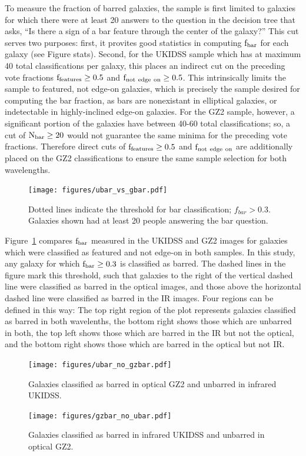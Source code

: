 To measure the fraction of barred galaxies, the sample is first limited to galaxies for which there were at least 20 answers to the question in the decision tree that asks, ``Is there a sign of a bar feature through the center of the galaxy?'' This cut serves two purposes: first, it provites good statistics in computing $\rm f_{bar}$ for each galaxy (see Figure stats). Second, for the UKIDSS sample which has at maximum 40 total classifications per galaxy, this places an indirect cut on the preceding vote fractions $\rm f_{features} \ge 0.5$ and $\rm f_{not~edge~on} \ge 0.5$. This intrinsically limits the sample to featured, not edge-on galaxies, which is precisely the sample desired for computing the bar fraction, as bars are nonexistant in elliptical galaxies, or indetectable in highly-inclined edge-on galaxies. For the GZ2 sample, however, a significant portion of the galaxies have between 40-60 total classifications; so, a cut of $\rm N_{bar} \ge 20$ would not guarantee the same minima for the preceding vote fractions. Therefore direct cuts of $\rm f_{features} \ge 0.5$ and $\rm f_{not~edge~on}$ are additionally placed on the GZ2 classifications to ensure the same sample selection for both wavelengths.  

\begin{figure}
\centering
\texttt{[image: figures/ubar\_vs\_gbar.pdf]}
\caption{Dotted lines indicate the threshold for bar classification; $f_{bar}>0.3$. Galaxies shown had at least 20 people answering the bar question. }
\label{fig:ubarvgbar}
\end{figure}

Figure~\ref{fig:ubarvgbar} compares $\rm f_{bar}$ measured in the UKIDSS and GZ2 images for galaxies which were classified as featured and not edge-on in both samples. In this study, any galaxy for which $\rm f_{bar} \ge 0.3$ is classified as barred. The dashed lines in the figure mark this threshold, such that galaxies to the right of the vertical dashed line were classified as barred in the optical images, and those above the horizontal dashed line were classified as barred in the IR images. Four regions can be defined in this way: The top right region of the plot represents galaxies classified as barred in both wavelenths, the bottom right shows those which are unbarred in both, the top left shows those which are barred in the IR but not the optical, and the bottom right shows those which are barred in the optical but not IR.  


\begin{figure}
\centering
\texttt{[image: figures/ubar\_no\_gzbar.pdf]}
\caption{Galaxies classified as barred in optical GZ2 and unbarred in infrared UKIDSS.}
\label{fig:ubarnogbar}
\end{figure}

\begin{figure}
\centering
\texttt{[image: figures/gzbar\_no\_ubar.pdf]}
\caption{Galaxies classified as barred in infrared UKIDSS and unbarred in optical GZ2.}
\label{fig:gbarnoubar}
\end{figure}


